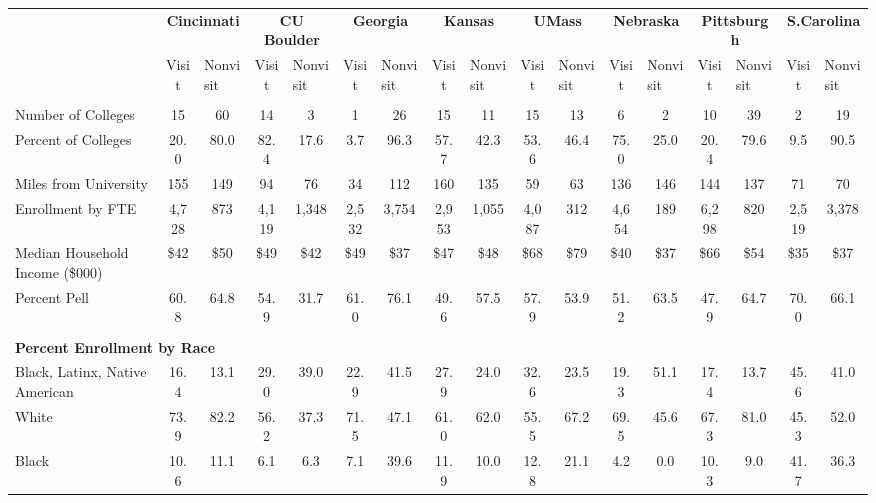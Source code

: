 \begin{tabular*}{\linewidth}{@{\extracolsep{\fill} } lcccccccccccccccc}%
&\multicolumn{2}{c}{\bfseries Cincinnati}&\multicolumn{2}{c}{\bfseries CU Boulder}&\multicolumn{2}{c}{\bfseries Georgia}&\multicolumn{2}{c}{\bfseries Kansas}&\multicolumn{2}{c}{\bfseries UMass}&\multicolumn{2}{c}{\bfseries Nebraska}&\multicolumn{2}{c}{\bfseries Pittsburgh}&\multicolumn{2}{c}{\bfseries S.Carolina}\\%
&Visit&\multicolumn{1}{l}{Nonvisit}&Visit&\multicolumn{1}{l}{Nonvisit}&Visit&\multicolumn{1}{l}{Nonvisit}&Visit&\multicolumn{1}{l}{Nonvisit}&Visit&\multicolumn{1}{l}{Nonvisit}&Visit&\multicolumn{1}{l}{Nonvisit}&Visit&\multicolumn{1}{l}{Nonvisit}&Visit&\multicolumn{1}{l}{Nonvisit}\\%
\hline%
&&&&&&&&&&&&&&&&\\%
\hspace{0cm}Number of Colleges&15&60&14&3&1&26&15&11&15&13&6&2&10&39&2&19\\%
Percent of Colleges&20.0&80.0&82.4&17.6&3.7&96.3&57.7&42.3&53.6&46.4&75.0&25.0&20.4&79.6&9.5&90.5\\%
\hspace{0cm}Miles from University&155&149&94&76&34&112&160&135&59&63&136&146&144&137&71&70\\%
\hspace{0cm}Enrollment by FTE&4,728&873&4,119&1,348&2,532&3,754&2,953&1,055&4,087&312&4,654&189&6,298&820&2,519&3,378\\%
\hspace{0cm}Median Household Income (\$000)&\$42&\$50&\$49&\$42&\$49&\$37&\$47&\$48&\$68&\$79&\$40&\$37&\$66&\$54&\$35&\$37\\%
\hspace{0cm}Percent Pell&60.8&64.8&54.9&31.7&61.0&76.1&49.6&57.5&57.9&53.9&51.2&63.5&47.9&64.7&70.0&66.1\\%
&&&&&&&&&&&&&&&&\\%
\multicolumn{17}{l}{\bfseries Percent Enrollment by Race}\\%
\hspace{0.2cm}Black, Latinx, Native American&16.4&13.1&29.0&39.0&22.9&41.5&27.9&24.0&32.6&23.5&19.3&51.1&17.4&13.7&45.6&41.0\\%
\hspace{0.2cm}White&73.9&82.2&56.2&37.3&71.5&47.1&61.0&62.0&55.5&67.2&69.5&45.6&67.3&81.0&45.3&52.0\\%
\hspace{0.2cm}Black&10.6&11.1&6.1&6.3&7.1&39.6&11.9&10.0&12.8&21.1&4.2&0.0&10.3&9.0&41.7&36.3\\%

\end{tabular*}
